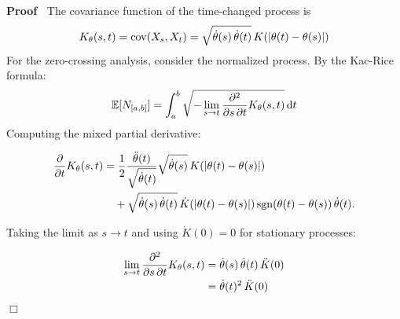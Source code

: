 \documentclass{article}
\newenvironment{proof}{\noindent\textbf{Proof\ }}{\hspace*{\fill}$\Box$\medskip}
\begin{document}
\begin{proof}
  The covariance function of the time-changed process is
  \begin{equation}
    \label{eq:time_changed_cov} K_{\theta} (s, t) = \mathrm{cov} (X_s, X_t) =
    \sqrt{\dot{\theta} (s)  \hspace{0.17em} \dot{\theta} (t)}  \hspace{0.17em}
    K (| \theta (t) - \theta (s) |)
  \end{equation}
  For the zero-crossing analysis, consider the normalized process. By the
  Kac-Rice formula:
  \begin{equation}
    \label{eq:kac_rice} \mathbb{E} [N_{[a, b]}] = \int_a^b \sqrt{- \lim_{s \to
    t}  \frac{\partial^2}{\partial s \hspace{0.17em} \partial t} K_{\theta}
    (s, t)} \hspace{0.17em} \mathrm{d} t
  \end{equation}
  Computing the mixed partial derivative:
  
  \begin{align}
    \frac{\partial}{\partial t} K_{\theta} (s, t) & = \frac{1}{2} 
    \frac{\ddot{\theta} (t)}{\sqrt{\dot{\theta} (t)}}  \sqrt{\dot{\theta} (s)}
    \hspace{0.17em} K (| \theta (t) - \theta (s) |) \\
    & \quad + \sqrt{\dot{\theta} (s)  \hspace{0.17em} \dot{\theta} (t)} 
    \hspace{0.17em} \dot{K} (| \theta (t) - \theta (s) |) \hspace{0.17em}
    \mathrm{sgn} (\theta (t) - \theta (s))  \hspace{0.17em} \dot{\theta} (t) .
    
  \end{align}
  
  Taking the limit as $s \to t$ and using $\dot{K} (0) = 0$ for stationary
  processes:
  
  \begin{align}
    \lim_{s \to t}  \frac{\partial^2}{\partial s \hspace{0.17em} \partial t}
    K_{\theta} (s, t) & = \dot{\theta} (s)  \hspace{0.17em} \dot{\theta} (t) 
    \hspace{0.17em} \ddot{K} (0) \\
    & = \dot{\theta} (t)^2  \hspace{0.17em} \ddot{K} (0) 
  \end{align}
  

\end{proof}
\end{document}
